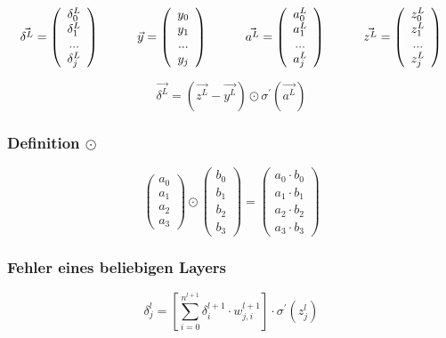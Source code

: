\documentclass{article}
\begin{document}
\[ \vec{\delta^L} = \left( \begin{array}{c}
     \delta_0^L \\ \delta_1^L \\ ... \\ \delta_j^L 
\end{array} \right)
\kern 30pt
\vec{y} = \left( \begin{array} {c}
    y_0 \\ y_1 \\ ... \\ y_j
\end{array} \right) 
\kern 30pt
\vec{a^L} = \left(\begin{array}{c}
    a_0^L \\ a_1^L \\ ... \\ a_j^L
\end{array} \right) 
\kern 30pt
\vec{z^L} = \left(\begin{array}{c}
    z_0^L \\ z_1^L \\ ... \\ z_j^L
\end{array} \right) 
\]

\[ \vec{\delta^L} = (\vec{z^L} - \vec{y^L}) \odot \sigma^{\prime}(\vec{a^L}) \]


\subsubsection{Definition $\odot$}
\[ \left(\begin{array}{c}
    a_0 \\ a_1 \\ a_2 \\ a_3
\end{array}\right)
\odot \left(\begin{array}{c}
    b_0 \\ b_1 \\ b_2 \\ b_3
\end{array}\right) 
= \left(\begin{array}{c}
    a_0 \cdot b_0 \\ a_1 \cdot b_1 \\ a_2 \cdot b_2 \\ a_3 \cdot b_3
\end{array}\right) \]

\pagebreak
\subsubsection{Fehler eines beliebigen Layers}
\[ \delta_j^{l} = [\sum_{i = 0}^{n^{l+1}} \delta_i^{l+1} \cdot w_{j,i}^{l+1}] \cdot \sigma^{\prime}(z_j^{l})  \]
\end{document}
